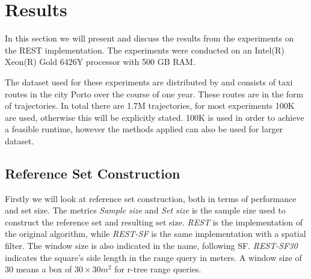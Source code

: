 \chapter{Results}
\label{chap:res}
In this section we will present and discuss the results from the experiments on the REST implementation. The experiments were conducted on an Intel(R) Xeon(R) Gold 6426Y processor with 500 GB RAM.

The dataset used for these experiments are distributed by \textcite{porto} and consists of taxi routes in the city Porto over the course of one year. These routes are in the form of trajectories. In total there are 1.7M trajectories, for most experiments 100K are used, otherwise this will be explicitly stated. 100K is used in order to achieve a feasible runtime, however the methods applied can also be used for larger dataset.

\section{Reference Set Construction}
Firstly we will look at reference set construction, both in terms of performance and set size. The metrics \textit{Sample size} and \textit{Set size} is the sample size used to construct the reference set and resulting set size. \textit{REST} is the implementation of the original algorithm, while \textit{REST-SF} is the same implementation with a spatial filter. The window size is also indicated in the name, following SF. \textit{REST-SF30} indicates the square's side length in the range query in meters. A window size of 30 means a box of $30\times30m^2$ for r-tree range queries.

